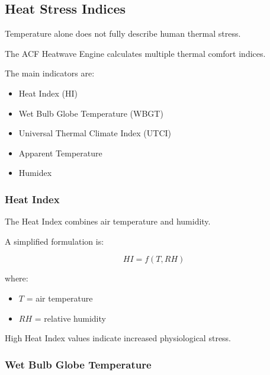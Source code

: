 \subsection{Heat Stress Indices}

Temperature alone does not fully describe human thermal stress.

The ACF Heatwave Engine calculates multiple thermal comfort indices.

The main indicators are:

\begin{itemize}

\item Heat Index (HI)

\item Wet Bulb Globe Temperature (WBGT)

\item Universal Thermal Climate Index (UTCI)

\item Apparent Temperature

\item Humidex

\end{itemize}



\subsubsection{Heat Index}

The Heat Index combines air temperature and humidity.

A simplified formulation is:

\[
HI=f(T,RH)
\]

where:

\begin{itemize}

\item $T$ = air temperature

\item $RH$ = relative humidity

\end{itemize}


High Heat Index values indicate increased physiological stress.



\subsubsection{Wet Bulb Globe Temperature}

